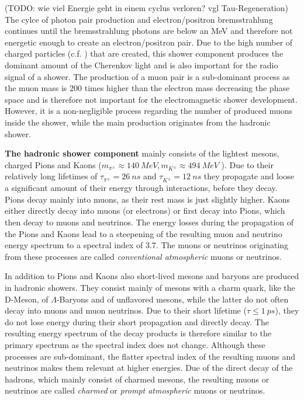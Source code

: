 (TODO: wie viel Energie geht in einem cyclus verloren? vgl Tau-Regeneration)
The cylce of photon pair production and electron/positron bremsstrahlung continues until the bremsstrahlung photons are below an MeV and therefore not energetic enough to create an electron/positron pair.
Due to the high number of charged particles (c.f. ) that are created, this shower component produces the dominant amount of the Cherenkov light and is also important for the radio signal of a shower.
The production of a muon pair is a sub-dominant process as the muon mass is 200 times higher than the electron mass decreasing the phase space and is therefore not important for the electromagnetic shower development.
However, it is a non-negligible process regarding the number of produced muons inside the shower, while the main production originates from the hadronic shower.

\textbf{The hadronic shower component} mainly consists of the lightest mesons, charged Pions and Kaons ($m_{\pi^{\pm}} \approx \SI{140}{MeV}, m_{K^{\pm}} \approx \SI{494}{MeV}$ \cite{PDG20}).
Due to their relatively long lifetimes of $\tau_{\pi^{\pm}} = \SI{26}{ns}$ and $\tau_{K^{\pm}} = \SI{12}{ns}$ they propagate and loose a significant amount of their energy through interactions, before they decay.
Pions decay mainly into muons, as their rest mass is just slightly higher.
Kaons either directly decay into muons (or electrons) or first decay into Pions, which then decay to muons and neutrinos.
The energy losses during the propagation of the Pions and Kaons lead to a steepening of the resulting muon and neutrino energy spectrum to a spectral index of \num{3.7}.
The muons or neutrinos originating from these processes are called \textit{conventional atmospheric} muons or neutrinos.

In addition to Pions and Kaons also short-lived mesons and baryons are produced in hadronic showers.
They consist mainly of mesons with a charm quark, like the D-Meson, of $\Lambda$-Baryons and of unflavored mesons, while the latter do not often decay into muons and muon neutrinos.
Due to their short lifetime ($\tau \leq \SI{1}{ps}$), they do not lose energy during their short propagation and directly decay.
The resulting energy spectrum of the decay products is therefore similar to the primary spectrum as the spectral index does not change.
Although these processes are sub-dominant, the flatter spectral index of the resulting muons and neutrinos makes them relevant at higher energies.
Due of the direct decay of the hadrons, which mainly consist of charmed mesons, the resulting muons or neutrinos are called \textit{charmed} or \textit{prompt atmospheric} muons or neutrinos.

